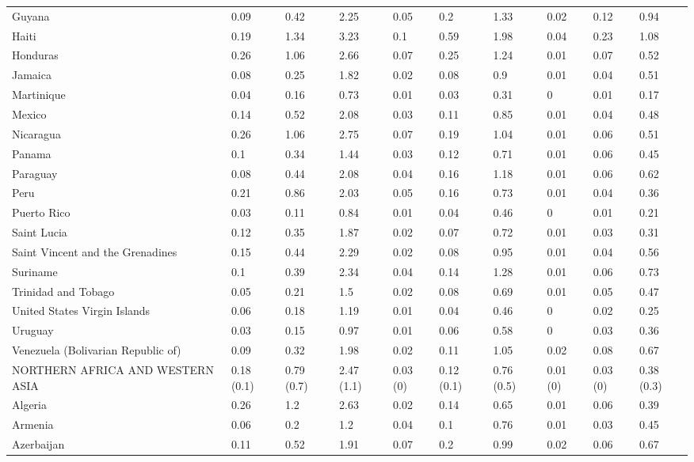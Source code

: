 \begin{longtable}[t]{llllllllll}
Guyana & 0.09 & 0.42 & 2.25 & 0.05 & 0.2 & 1.33 & 0.02 & 0.12 & 0.94\\
Haiti & 0.19 & 1.34 & 3.23 & 0.1 & 0.59 & 1.98 & 0.04 & 0.23 & 1.08\\
Honduras & 0.26 & 1.06 & 2.66 & 0.07 & 0.25 & 1.24 & 0.01 & 0.07 & 0.52\\
Jamaica & 0.08 & 0.25 & 1.82 & 0.02 & 0.08 & 0.9 & 0.01 & 0.04 & 0.51\\
Martinique & 0.04 & 0.16 & 0.73 & 0.01 & 0.03 & 0.31 & 0 & 0.01 & 0.17\\
Mexico & 0.14 & 0.52 & 2.08 & 0.03 & 0.11 & 0.85 & 0.01 & 0.04 & 0.48\\
Nicaragua & 0.26 & 1.06 & 2.75 & 0.07 & 0.19 & 1.04 & 0.01 & 0.06 & 0.51\\
Panama & 0.1 & 0.34 & 1.44 & 0.03 & 0.12 & 0.71 & 0.01 & 0.06 & 0.45\\
Paraguay & 0.08 & 0.44 & 2.08 & 0.04 & 0.16 & 1.18 & 0.01 & 0.06 & 0.62\\
Peru & 0.21 & 0.86 & 2.03 & 0.05 & 0.16 & 0.73 & 0.01 & 0.04 & 0.36\\
Puerto Rico & 0.03 & 0.11 & 0.84 & 0.01 & 0.04 & 0.46 & 0 & 0.01 & 0.21\\
Saint Lucia & 0.12 & 0.35 & 1.87 & 0.02 & 0.07 & 0.72 & 0.01 & 0.03 & 0.31\\
Saint Vincent and the Grenadines & 0.15 & 0.44 & 2.29 & 0.02 & 0.08 & 0.95 & 0.01 & 0.04 & 0.56\\
Suriname & 0.1 & 0.39 & 2.34 & 0.04 & 0.14 & 1.28 & 0.01 & 0.06 & 0.73\\
Trinidad and Tobago & 0.05 & 0.21 & 1.5 & 0.02 & 0.08 & 0.69 & 0.01 & 0.05 & 0.47\\
United States Virgin Islands & 0.06 & 0.18 & 1.19 & 0.01 & 0.04 & 0.46 & 0 & 0.02 & 0.25\\
Uruguay & 0.03 & 0.15 & 0.97 & 0.01 & 0.06 & 0.58 & 0 & 0.03 & 0.36\\
Venezuela (Bolivarian Republic of) & 0.09 & 0.32 & 1.98 & 0.02 & 0.11 & 1.05 & 0.02 & 0.08 & 0.67\\
NORTHERN AFRICA AND WESTERN ASIA & 0.18 (0.1) & 0.79 (0.7) & 2.47 (1.1) & 0.03 (0) & 0.12 (0.1) & 0.76 (0.5) & 0.01 (0) & 0.03 (0) & 0.38 (0.3)\\
Algeria & 0.26 & 1.2 & 2.63 & 0.02 & 0.14 & 0.65 & 0.01 & 0.06 & 0.39\\
Armenia & 0.06 & 0.2 & 1.2 & 0.04 & 0.1 & 0.76 & 0.01 & 0.03 & 0.45\\
Azerbaijan & 0.11 & 0.52 & 1.91 & 0.07 & 0.2 & 0.99 & 0.02 & 0.06 & 0.67\\

\end{longtable}
